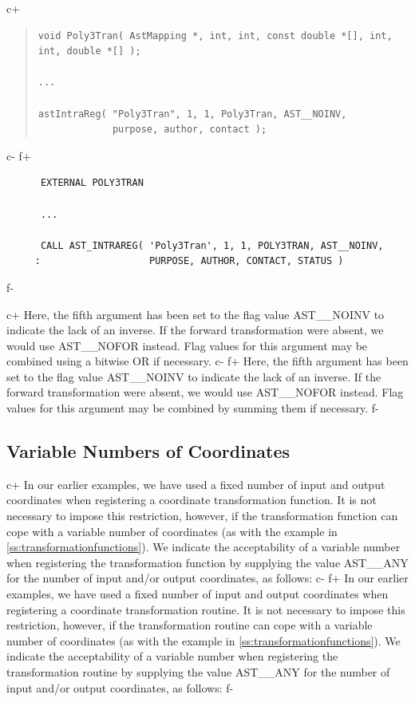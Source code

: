 \documentclass[twoside,11pt]{article}
\newcommand{\secref}[1]{\S\ref{#1}}
\renewcommand{\secref}[1]{\ref{#1}}
\begin{document}
c+
\begin{quote}
\small
\begin{verbatim}
void Poly3Tran( AstMapping *, int, int, const double *[], int, int, double *[] );

...

astIntraReg( "Poly3Tran", 1, 1, Poly3Tran, AST__NOINV,
             purpose, author, contact );
\end{verbatim}
\normalsize
\end{quote}
c-
f+
\small
\begin{verbatim}
      EXTERNAL POLY3TRAN

      ...

      CALL AST_INTRAREG( 'Poly3Tran', 1, 1, POLY3TRAN, AST__NOINV,
     :                   PURPOSE, AUTHOR, CONTACT, STATUS )
\end{verbatim}
\normalsize
f-

c+
Here, the fifth argument has been set to the flag value AST\_\_NOINV
to indicate the lack of an inverse. If the forward transformation were
absent, we would use AST\_\_NOFOR instead. Flag values for this
argument may be combined using a bitwise OR if necessary.
c-
f+
Here, the fifth argument has been set to the flag value AST\_\_NOINV
to indicate the lack of an inverse. If the forward transformation were
absent, we would use AST\_\_NOFOR instead. Flag values for this
argument may be combined by summing them if necessary.
f-

\subsection{\label{ss:variableintramapcoordinates}Variable Numbers of Coordinates}

c+
In our earlier examples, we have used a fixed number of input and
output coordinates when registering a coordinate transformation
function. It is not necessary to impose this restriction, however, if
the transformation function can cope with a variable number of
coordinates (as with the example in
\secref{ss:transformationfunctions}). We indicate the acceptability of
a variable number when registering the transformation function by
supplying the value AST\_\_ANY for the number of input and/or output
coordinates, as follows:
c-
f+
In our earlier examples, we have used a fixed number of input and
output coordinates when registering a coordinate transformation
routine. It is not necessary to impose this restriction, however, if
the transformation routine can cope with a variable number of
coordinates (as with the example in
\secref{ss:transformationfunctions}). We indicate the acceptability of
a variable number when registering the transformation routine by
supplying the value AST\_\_ANY for the number of input and/or output
coordinates, as follows:
f-
\end{document}
